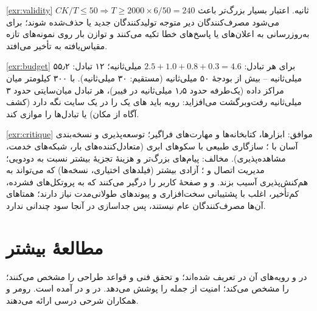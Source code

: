 \documentclass[11pt,a4paper]{article}
\begin{document}
\begin{solutionbox}{\ref{exr:validity}}
$CK/T \le 50 \Rightarrow T \ge 2000\times6/50 = 240$ ثانیه. اعتبار بسیار بزرگ‌تر باعث می‌شود مصرف‌کنندگان دیر متوجه
تولیدکنندگان جدید یا حذف‌شده شوند؛ برای به‌روزرسانی به اعلان‌های  یا پاسخ‌های خطا تکیه می‌کنند و توازن بار روی نمونه‌های
تازه مقیاس‌یافته به تأخیر می‌افتد.
\end{solutionbox}

\begin{solutionbox}{\ref{exr:budget}}
برای هر تبادل: $2.5 + 1.0 + 0.8 + 0.3 = 4.6$ میلی‌ثانیه؛ ۱۲ تبادل: ۵۵٫۲ میلی‌ثانیه -- بیش از بودجهٔ ۵۰ میلی‌ثانیه (مستقیم: ۳۰
میلی‌ثانیه). با ۳۰۰ کیلومتر میان مراکز داده (یک‌طرفه حدود ۱٫۵ میلی‌ثانیه در فیبر)، هر تبادل میان‌سایتی حدود ۳ میلی‌ثانیه
رفت‌وبرگشت می‌افزاید: رویه باید های یک  را در یک سایت نگه دارد (کشف آگاه از مکان) یا تبادل‌ها را موازی کند.
\end{solutionbox}

\begin{solutionbox}{\ref{exr:critique}}
موافق: ابزارها، کتابخانه‌ها و مهارت‌های فراگیر؛ توسعه‌پذیری و نسخه‌بندی آسان با ؛ سازگاری طبیعی با سکوهای ابری
(متعادل‌کننده‌های بار، شبکه‌های خدمت، مشاهده‌پذیری). مخالف: پیام‌های بزرگ‌تر و هزینهٔ تجزیهٔ بیشتر نسبت به  دودویی؛
مدیریت اتصال  و ؛ آزادی بیشتر (فیلدهای اختیاری، نسخه‌ها) که می‌تواند به هم‌کنش‌پذیری آسیب بزند.  و
  و صفحهٔ کاربر را درگیر می‌کنند که به پروتکل‌های فشرده، کم‌تأخیر، اغلب با پشتیبانی سخت‌افزاری و پیوندهای
طولانی‌مدت نیاز دارند؛ همتاهای آن‌ها مصرف‌کنندگان عام نیستند، پس جداسازی  در آنجا سود چندانی ندارد.
\end{solutionbox}

\section{مطالعهٔ بیشتر}
 در  \cite{ts23501} و رویه‌های آن در  \cite{ts23502} تعریف شده‌اند؛ 
\cite{ts29500} و  \cite{ts29501} تحقق فنی و قواعد طراحی  را مشخص می‌کنند؛  \cite{ts29510}
 را مشخص می‌کند؛  \cite{ts33501} امنیت  از جمله  را پوشش می‌دهد.  در
 \cite{rfc9113} و  در  \cite{rfc6749} آمده است. رومر و همکاران \cite{rommer2020core}
شرحی درسی ارائه می‌دهند.

\begin{latin}
\printbibliography[heading=subbibliography,title={References}]
\end{latin}
\end{document}

